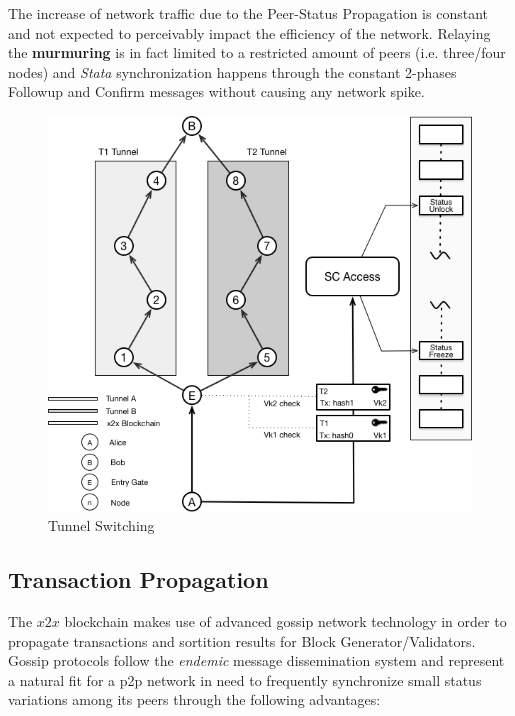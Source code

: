The increase of network traffic due to the Peer-Status Propagation is
constant and not expected to perceivably impact the efficiency of the
network. Relaying the \textbf{murmuring} is in fact limited to a
restricted amount of peers (i.e. three/four nodes) and \emph{Stata}
synchronization happens through the constant 2-phases Followup and
Confirm messages without causing any network spike.
\begin{figure}
\includegraphics[scale=0.5]{tunnelswitch}
\caption{Tunnel Switching}
\label{tunnelswitch}
\end{figure}
\subsection{Transaction Propagation}

The \(x2x\) blockchain makes use of advanced gossip network technology
in order to propagate transactions and sortition results for Block
Generator/Validators. Gossip protocols follow the \emph{endemic} message
dissemination system and represent a natural fit for a p2p network in
need to frequently synchronize small status variations among its peers
through the following advantages:


